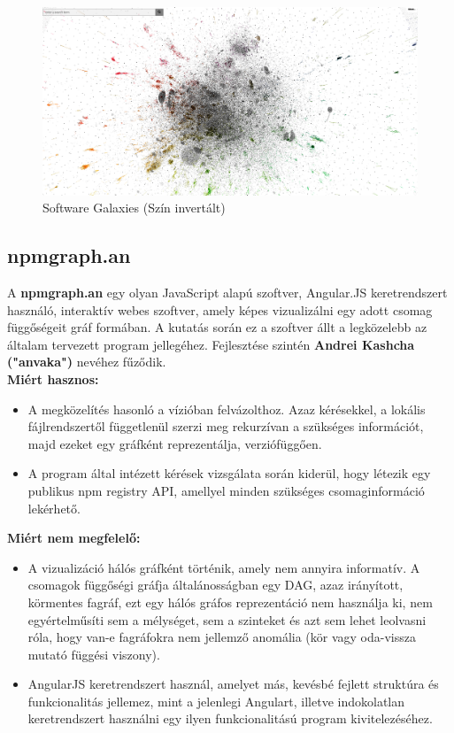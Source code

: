 	\begin{flushright}
		\cite{anvaka-galaxies}
	\end{flushright}
	
	\begin{figure}[!h]
		\centering
		\includegraphics[scale=0.1]{images/anvaka_pm.png}
		\caption{Software Galaxies (Szín invertált)}
		\label{fig:sw-galaxies}
	\end{figure}
	
	\subsection{npmgraph.an}
	
	A \textbf{npmgraph.an} egy olyan JavaScript alapú szoftver, Angular.JS keretrendszert használó, interaktív webes szoftver, amely képes vizualizálni egy adott csomag függőségeit gráf formában. A kutatás során ez a szoftver állt a legközelebb az általam tervezett program jellegéhez.	Fejlesztése szintén \textbf{Andrei Kashcha ("anvaka")} nevéhez fűződik.	\\
	
	\textbf{Miért hasznos:}
	\begin{itemize}
		\item A megközelítés hasonló a vízióban felvázolthoz. Azaz kérésekkel, a lokális fájlrendszertől függetlenül szerzi meg rekurzívan a szükséges információt, majd ezeket egy gráfként reprezentálja, verziófüggően.
		\item A program által intézett kérések vizsgálata során kiderül, hogy létezik egy publikus npm registry API, amellyel minden szükséges csomaginformáció lekérhető.
	\end{itemize}
	
	\textbf{Miért nem megfelelő:}
	\begin{itemize}
		\item A vizualizáció hálós gráfként történik, amely nem annyira informatív. A csomagok függőségi gráfja általánosságban egy DAG, azaz irányított, körmentes fagráf, ezt egy hálós gráfos reprezentáció nem használja ki, nem egyértelműsíti sem a mélységet, sem a szinteket és azt sem lehet leolvasni róla, hogy van-e fagráfokra nem jellemző anomália (kör vagy oda-vissza mutató függési viszony).
		\item AngularJS keretrendszert használ, amelyet más, kevésbé fejlett struktúra és funkcionalitás jellemez, mint a jelenlegi Angulart, illetve indokolatlan keretrendszert használni egy ilyen funkcionalitású program kivitelezéséhez.  
	\end{itemize}
	
